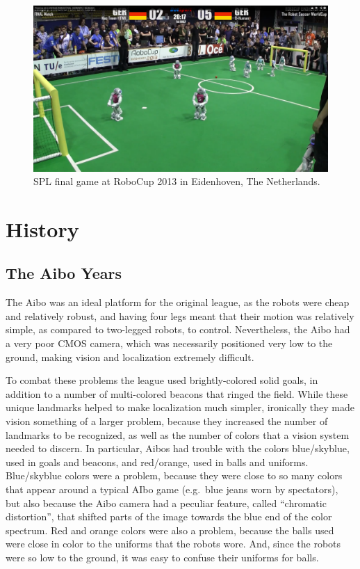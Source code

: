\documentclass{llncs}
\begin{document}
\begin{figure}[t]
\centerline{
\includegraphics[width=0.9\columnwidth]{"spl2013"}
}
  \caption{SPL final game at RoboCup 2013 in Eidenhoven, The Netherlands.}
  \label{spl2013}
\end{figure} 

\section{History}

\subsection{The Aibo Years}

The Aibo was
an ideal platform for the original league, as the robots were cheap and relatively robust,
and having four legs meant that their motion was relatively simple, as compared
to two-legged robots, to control. Nevertheless, the Aibo had a very poor CMOS camera, which was necessarily positioned very low to the ground, making vision and localization extremely
difficult. 

To combat these problems the league used brightly-colored solid goals, in addition
to a number of multi-colored beacons that ringed the field. While these unique
landmarks helped to make localization much simpler, ironically they made
vision something of a larger problem, because they increased the number of landmarks
to be recognized, as well as the number of colors that a vision system needed to
discern. In particular, Aibos had trouble with the colors blue/skyblue, used in
goals and beacons, and red/orange, used in balls and uniforms. Blue/skyblue colors
were a problem, because they were close to so many colors that appear
around a typical AIbo game (e.g.~blue jeans worn by spectators), but also because
the Aibo camera had a peculiar feature, called ``chromatic distortion'', that
shifted parts of the image towards the blue end of the color spectrum. Red
and orange colors were also a problem, because the balls used were close in color to the
uniforms that the robots wore. And, since the robots were so low to the ground, it
was easy to confuse their uniforms for balls.
\end{document}
